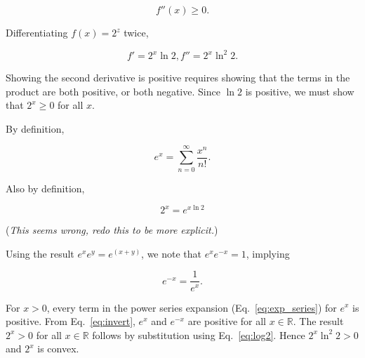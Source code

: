 \documentclass{article}
\begin{document}
\begin{equation}
  f''(x) \geq 0.
\end{equation}

Differentiating $f(x) = 2^z$ twice,

\begin{equation}
  f' = 2^x \ln 2, f'' = 2^x\ln^2 2.
\end{equation}

Showing the second derivative is positive requires showing that the
terms in the product are both positive, or both negative. Since $\ln 2$
is positive, we must show that $2^x \geq 0$ for all $x$.

By definition,

\begin{equation}\label{eq:exp_series}
  e^x = \sum_{n=0}^\infty \frac{x^n}{n!}.
\end{equation}

Also by definition,

\begin{equation}\label{eq:log2}
  2^x = e^{x\ln 2}
\end{equation}

(\textit{This seems wrong, redo this to be more explicit.})

Using the result $e^xe^y = e^{(x+y)}$, we note that $e^xe^{-x} = 1$, implying

\begin{equation}\label{eq:invert}
  e^{-x} = \frac{1}{e^x}.
\end{equation}

For $x > 0$, every term in the power series expansion
(Eq.~\ref{eq:exp_series}) for $e^x$ is positive.
From Eq.~\ref{eq:invert}, $e^x$ and $e^{-x}$ are positive for all $x\in\mathbb{R}$. The result
$2^x > 0$ for all $x\in\mathbb{R}$ follows by substitution using
Eq.~\ref{eq:log2}. Hence $2^x\ln^2 2 > 0$ and $2^x$ is convex.

\begin{comment}
Substituting and expanding:

\begin{equation}
  2^x = 1 + x\ln 2 + \frac{x^2 \ln^2 2}{2!} + \frac{x^3 \ln^3 2}{3!} + \cdots.
\end{equation}

For $x > 0, 2^x$ is clearly positive. For $x = 0, 2^0 = 1$, again positive. When $x < 0$,

\begin{equation}
  2^{-x} = 1 - x\ln 2 + \frac{x^2 \ln^2 2}{2!} - \frac{x^3 \ln^3 2}{3!} + \frac{x^4 \ln^4 2}{4!}
  - \frac{x^5 \ln^5 2}{5!} + \cdots.
\end{equation}
\end{comment}
\end{document}
